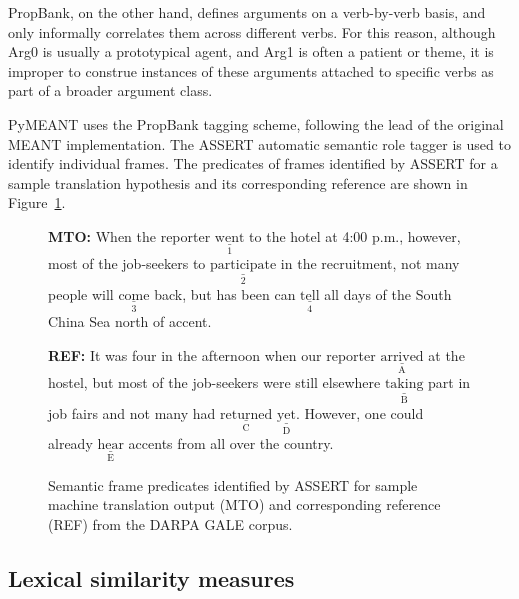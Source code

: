 \documentclass[11pt,twocolumn]{article}
\begin{document}
PropBank, on the other hand, defines arguments on a verb-by-verb basis,
and only informally correlates them across different verbs.
For this reason, although \textsf{Arg0} is usually a prototypical
agent, and \textsf{Arg1} is often a patient or theme, it is improper to
construe instances of these arguments attached to specific verbs as part
of a broader argument class.

PyMEANT uses the PropBank tagging scheme, following the lead of the
original MEANT implementation.
The ASSERT automatic semantic role tagger \cite{Pradhan:2004} is used to
identify individual frames.
The predicates of frames identified by ASSERT for a sample translation
hypothesis and its corresponding reference are shown in
Figure~\ref{fig:predicates}.

\begin{figure}
\begin{doublespacing}
\begin{description}
\item \textbf{MTO:}
When the reporter $\underset{\textrm{1}}{\underline{\textrm{went}}}$ to
the hotel at 4:00 p.m., however, most of the job-seekers to
$\underset{\textrm{2}}{\underline{\textrm{participate}}}$ in the
recruitment, not many people will
$\underset{\textrm{3}}{\underline{\textrm{come}}}$ back, but has been
can $\underset{\textrm{4}}{\underline{\textrm{tell}}}$ all days of the
South China Sea north of accent.

\item \textbf{REF:}
It was four in the afternoon when our reporter
$\underset{\textrm{A}}{\underline{\textrm{arrived}}}$ at the hostel, but
most of the job-seekers were still elsewhere
$\underset{\textrm{B}}{\underline{\textrm{taking}}}$ part in job fairs
and not many had $\underset{\textrm{C}}{\underline{\textrm{returned}}}$
$\underset{\textrm{D}}{\underline{\textrm{yet}}}$.
However, one could already
$\underset{\textrm{E}}{\underline{\textrm{hear}}}$ accents from all over
the country.
\end{description}
\end{doublespacing}
\caption{\label{fig:predicates}
Semantic frame predicates identified by \mbox{ASSERT} for sample machine
translation output (MTO) and corresponding reference (REF) from the
DARPA GALE corpus.
}
\end{figure}


\subsection{\label{sec:lexsim} Lexical similarity measures}
\end{document}
